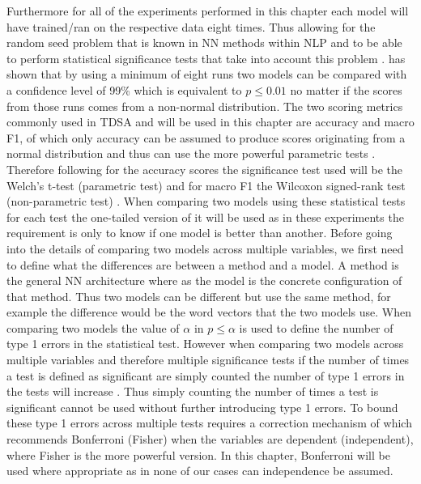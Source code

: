 Furthermore for all of the experiments performed in this chapter each model will have trained/ran on the respective data eight times. Thus allowing for the random seed problem that is known in NN methods within NLP \citep{reimers-gurevych-2017-reporting} and to be able to perform statistical significance tests that take into account this problem \citep{reimers2018comparing}. \citet{reimers2018comparing} has shown that by using a minimum of eight runs two models can be compared with a confidence level of 99\% which is equivalent to $p \leq 0.01$ no matter if the scores from those runs comes from a non-normal distribution. The two scoring metrics commonly used in TDSA and will be used in this chapter are accuracy and macro F1, of which only accuracy can be assumed to produce scores originating from a normal distribution and thus can use the more powerful parametric tests \citep{dror-etal-2018-hitchhikers}. Therefore following \citet{reimers2018comparing} for the accuracy scores the significance test used will be the Welch's t-test (parametric test) \citep{welch_t_test} and for macro F1 the Wilcoxon signed-rank test (non-parametric test) \citep{wilcox_signed_test}. When comparing two models using these statistical tests for each test the one-tailed version of it will be used as in these experiments the requirement is only to know if one model is better than another. Before going into the details of comparing two models across multiple variables, we first need to define what the differences are between a method and a model. A method is the general NN architecture where as the model is the concrete configuration of that method. Thus two models can be different but use the same method, for example the difference would be the word vectors that the two models use. When comparing two models the value of $\alpha$ in $p \leq \alpha$ is used to define the number of type 1 errors in the statistical test. However when comparing two models across multiple variables and therefore multiple significance tests if the number of times a test is defined as significant are simply counted the number of type 1 errors in the tests will increase \citep{dror-etal-2017-replicability}. Thus simply counting the number of times a test is significant cannot be used without further introducing type 1 errors. To bound these type 1 errors across multiple tests requires a correction mechanism of which \citet{dror-etal-2017-replicability} recommends Bonferroni (Fisher) when the variables are dependent (independent), where Fisher is the more powerful version. In this chapter, Bonferroni will be used where appropriate as in none of our cases can independence be assumed.

